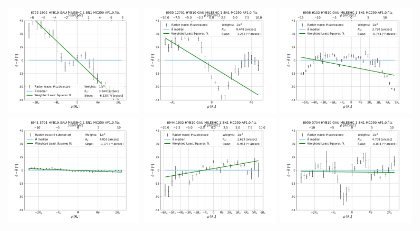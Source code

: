 \begin{figure}
    \centering
    \includegraphics[width=0.31\textwidth]{Images/WLSFITS/CPSB/8725-1902.png}
    \includegraphics[width=0.31\textwidth]{Images/WLSFITS/CPSB/8935-12701.png}
    \includegraphics[width=0.31\textwidth]{Images/WLSFITS/CPSB/8938-6102.png}
    \includegraphics[width=0.31\textwidth]{Images/WLSFITS/CPSB/8941-3701.png}
    \includegraphics[width=0.31\textwidth]{Images/WLSFITS/CPSB/8944-1902.png}
    \includegraphics[width=0.31\textwidth]{Images/WLSFITS/CPSB/8950-3704.png}

\end{figure}
